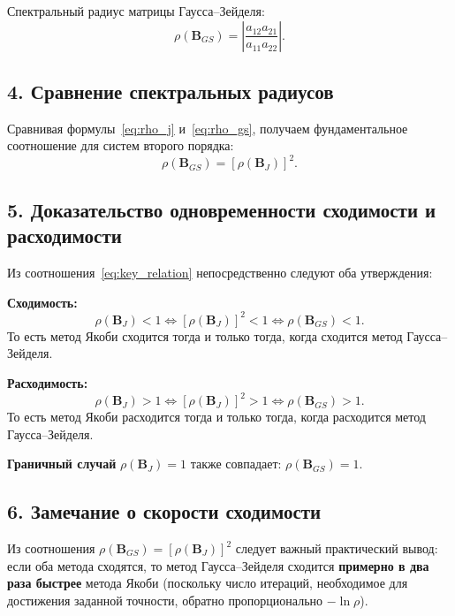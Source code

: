 \documentclass{article}
\begin{document}
Спектральный радиус матрицы Гаусса--Зейделя:
\begin{equation}
\rho(\mathbf{B}_{GS}) = \left|\frac{a_{12} a_{21}}{a_{11} a_{22}}\right|.
\label{eq:rho_gs}
\end{equation}

\subsection*{4. Сравнение спектральных радиусов}

Сравнивая формулы~\eqref{eq:rho_j} и~\eqref{eq:rho_gs}, получаем фундаментальное соотношение для систем второго порядка:
\begin{equation}
\boxed{\rho(\mathbf{B}_{GS}) = \left[\rho(\mathbf{B}_J)\right]^2.}
\label{eq:key_relation}
\end{equation}

\subsection*{5. Доказательство одновременности сходимости и расходимости}

Из соотношения~\eqref{eq:key_relation} непосредственно следуют оба утверждения:

\textbf{Сходимость:}
\begin{equation}
\rho(\mathbf{B}_J) < 1 \iff \left[\rho(\mathbf{B}_J)\right]^2 < 1 \iff \rho(\mathbf{B}_{GS}) < 1.
\end{equation}
То есть метод Якоби сходится тогда и только тогда, когда сходится метод Гаусса--Зейделя.

\textbf{Расходимость:}
\begin{equation}
\rho(\mathbf{B}_J) > 1 \iff \left[\rho(\mathbf{B}_J)\right]^2 > 1 \iff \rho(\mathbf{B}_{GS}) > 1.
\end{equation}
То есть метод Якоби расходится тогда и только тогда, когда расходится метод Гаусса--Зейделя.

\textbf{Граничный случай} $\rho(\mathbf{B}_J) = 1$ также совпадает: $\rho(\mathbf{B}_{GS}) = 1$.

\subsection*{6. Замечание о скорости сходимости}

Из соотношения $\rho(\mathbf{B}_{GS}) = [\rho(\mathbf{B}_J)]^2$ следует важный практический вывод: если оба метода сходятся, то метод Гаусса--Зейделя сходится \textbf{примерно в два раза быстрее} метода Якоби (поскольку число итераций, необходимое для достижения заданной точности, обратно пропорционально $-\ln \rho$).
\end{document}
